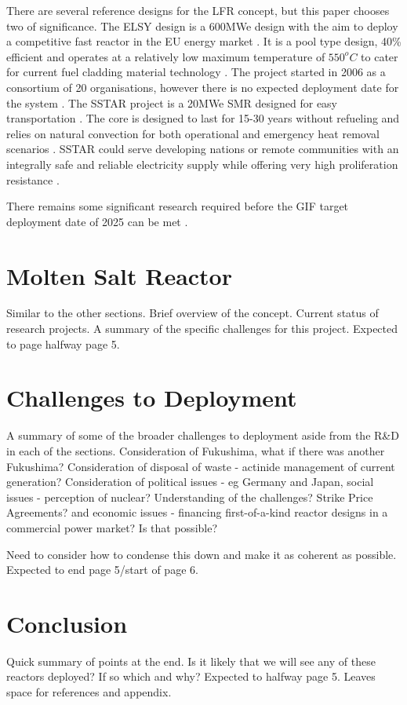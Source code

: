 \documentclass[journal]{IEEEtran}
\begin{document}
There are several reference designs for the LFR concept, but this paper chooses two of significance.
The ELSY design is a 600MWe design with the aim to deploy a competitive fast reactor in the EU energy market \cite{Locatelli2013}.
It is a pool type design, 40\% efficient and operates at a relatively low maximum temperature of $550^{o}C$ to cater for current fuel cladding material technology \cite{Int2012}.
The project started in 2006 as a consortium of 20 organisations, however there is no expected deployment date for the system \cite{GenIVForum}.
The SSTAR project is a 20MWe SMR designed for easy transportation \cite{GenIVForum}.
The core is designed to last for 15-30 years without refueling and relies on natural convection for both operational and emergency heat removal scenarios \cite{Int2012}.
SSTAR could serve developing nations or remote communities with an integrally safe and reliable electricity supply while offering very high proliferation resistance \cite{Int2012}.

There remains some significant research required before the GIF target deployment date of 2025 can be met \cite{GenIVRoadmap}.


\section{Molten Salt Reactor}
Similar to the other sections. 
Brief overview of the concept. 
Current status of research projects. 
A summary of the specific challenges for this project.
Expected to page halfway page 5.
\section{Challenges to Deployment}
A summary of some of the broader challenges to deployment aside from the R\&D in each of the sections.
Consideration of Fukushima, what if there was another Fukushima?
Consideration of disposal of waste - actinide management of current generation?
Consideration of political issues - eg Germany and Japan, social issues - perception of nuclear? Understanding of the challenges? Strike Price Agreements? and economic issues - financing first-of-a-kind reactor designs in a commercial power market? Is that possible?

Need to consider how to condense this down and make it as coherent as possible.
Expected to end page 5/start of page 6.
\section{Conclusion}
Quick summary of points at the end.
Is it likely that we will see any of these reactors deployed?
If so which and why?
Expected to halfway page 5.
Leaves space for references and appendix.
\end{document}
